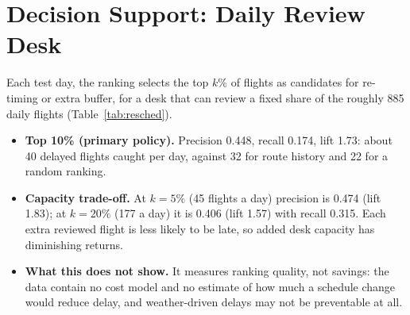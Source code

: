\documentclass[conference]{IEEEtran}
\newcommand{\tabsize}{\footnotesize}
\begin{document}
\section{Decision Support: Daily Review Desk}\label{sec:resched}
Each test day, the ranking selects the top $k\%$ of flights as candidates for re-timing or extra buffer, for a desk that can review a fixed share of the roughly 885 daily flights (Table~\ref{tab:resched}).
\begin{itemize}
\item \textbf{Top 10\% (primary policy).} Precision 0.448, recall 0.174, lift 1.73: about 40 delayed flights caught per day, against 32 for route history and 22 for a random ranking.
\item \textbf{Capacity trade-off.} At $k=5\%$ (45 flights a day) precision is 0.474 (lift 1.83); at $k=20\%$ (177 a day) it is 0.406 (lift 1.57) with recall 0.315. Each extra reviewed flight is less likely to be late, so added desk capacity has diminishing returns.
\item \textbf{What this does not show.} It measures ranking quality, not savings: the data contain no cost model and no estimate of how much a schedule change would reduce delay, and weather-driven delays may not be preventable at all.
\end{itemize}

\begin{table}[!t]
\caption{Daily top-$k\%$ review desk on test: flights flagged per day, precision (P), recall (R) and lift of logistic regression (LR), and precision of XGBoost, route history and the random prior ranking.}
\label{tab:resched}
\centering\tabsize\setlength{\tabcolsep}{3.5pt}

\end{table}

\end{document}
